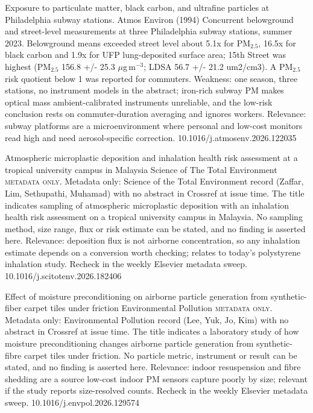 \documentclass[10pt]{article}
\begin{document}
{Exposure to particulate matter, black carbon, and ultrafine particles at Philadelphia subway stations.}
{Atmos Environ (1994)}
{Concurrent belowground and street-level measurements at three Philadelphia subway stations, summer 2023. Belowground means exceeded street level about 5.1x for PM$_{2.5}$, 16.5x for black carbon and 1.9x for UFP lung-deposited surface area; 15th Street was highest (PM$_{2.5}$ 156.8 +/- 25.3 $\mu$g\,m$^{-3}$; LDSA 56.7 +/- 21.2 um2/cm3). A PM$_{2.5}$ risk quotient below 1 was reported for commuters. Weakness: one season, three stations, no instrument models in the abstract; iron-rich subway PM makes optical mass ambient-calibrated instruments unreliable, and the low-risk conclusion rests on commuter-duration averaging and ignores workers. Relevance: subway platforms are a microenvironment where personal and low-cost monitors read high and need aerosol-specific correction.}
{10.1016/j.atmosenv.2026.122035}

{Atmospheric microplastic deposition and inhalation health risk assessment at a tropical university campus in Malaysia}
{Science of The Total Environment}
{\textsc{metadata only.} Metadata only: Science of the Total Environment record (Zaffar, Lim, Sethupathi, Muhamad) with no abstract in Crossref at issue time. The title indicates sampling of atmospheric microplastic deposition with an inhalation health risk assessment on a tropical university campus in Malaysia. No sampling method, size range, flux or risk estimate can be stated, and no finding is asserted here. Relevance: deposition flux is not airborne concentration, so any inhalation estimate depends on a conversion worth checking; relates to today's polystyrene inhalation study. Recheck in the weekly Elsevier metadata sweep.}
{10.1016/j.scitotenv.2026.182406}

{Effect of moisture preconditioning on airborne particle generation from synthetic-fiber carpet tiles under friction}
{Environmental Pollution}
{\textsc{metadata only.} Metadata only: Environmental Pollution record (Lee, Yuk, Jo, Kim) with no abstract in Crossref at issue time. The title indicates a laboratory study of how moisture preconditioning changes airborne particle generation from synthetic-fibre carpet tiles under friction. No particle metric, instrument or result can be stated, and no finding is asserted here. Relevance: indoor resuspension and fibre shedding are a source low-cost indoor PM sensors capture poorly by size; relevant if the study reports size-resolved counts. Recheck in the weekly Elsevier metadata sweep.}
{10.1016/j.envpol.2026.129574}
\end{document}
